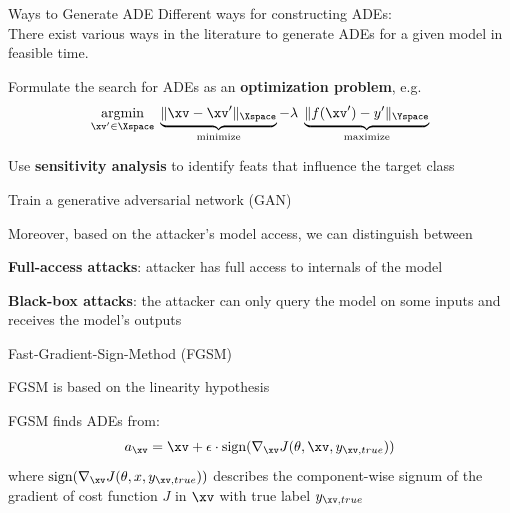 \documentclass[10pt,compress,t,notes=noshow, xcolor=table]{beamer}
\begin{document}
\begin{framev}[align=top]{Ways to Generate ADE}
Different ways for constructing ADEs:\\
There exist various ways in the literature to generate ADEs for a given model in feasible time.
\begin{itemizeM}
\item Formulate the search for ADEs as an \textbf{optimization problem}, e.g.
\begin{equation*}
\label{eq:optimization}
\underset{\xv' \in \Xspace}{\text{argmin}}\; \underbrace{\|\xv - \xv'\|_{\Xspace}}_{\text{minimize}} - \lambda\; \underbrace{\|f(\xv') - y'\|_{\Yspace}}_{\text{maximize}}
\end{equation*}
\item Use \textbf{sensitivity analysis} to identify feats that influence the target class
\item Train a generative adversarial network (GAN) 
\end{itemizeM}
Moreover, based on the attacker's model access, we can distinguish between
\begin{itemizeM}
\item \textbf{Full-access attacks}: attacker has full access to internals of the model
\item \textbf{Black-box attacks}: the attacker can only query the model on some inputs and receives the model's outputs
\end{itemizeM}
\end{framev}


\begin{framev}[align=top]{Fast-Gradient-Sign-Method (FGSM) }
\begin{itemizeM}
\item FGSM is based on the linearity hypothesis
\item FGSM finds ADEs from:
\begin{equation*}
a_{\xv} = \xv + \epsilon \cdot \text{sign}(\nabla_{\xv} J(\theta,\xv,y_{\xv,true}))
\end{equation*}
where $\text{sign}(\nabla_{\xv} J(\theta,x,y_{\xv,true}))$ describes the component-wise signum of the gradient of cost function $J$ in $\xv$ with true label $y_{\xv,true}$
\end{itemizeM}
\end{framev}
\end{document}
